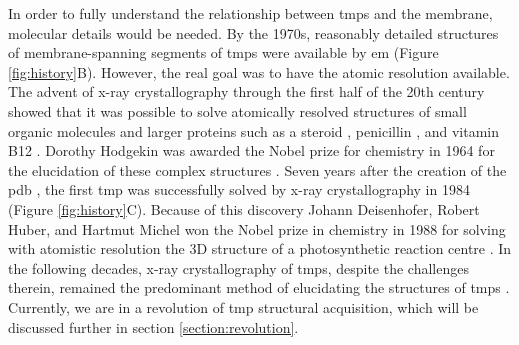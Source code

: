 In order to fully understand the relationship between \gls{tmp}s and the membrane, molecular details would be needed.
By the 1970s, reasonably detailed structures of membrane\--spanning segments of \gls{tmp}s were available by \gls{em} \cite{Henderson1975} (Figure \ref{fig:history}B).
However, the real goal was to have the atomic resolution available.
The advent of x\--ray crystallography through the first half of the 20th century showed that it was possible to solve atomically resolved structures of small organic molecules \cite{Lonsdale1928, Dickinson1923} and larger proteins such as a steroid \cite{Carlisle1945}, penicillin \cite{Hodgekin1949}, and vitamin B12 \cite{HODGKIN1955}.
Dorothy Hodgekin was awarded the Nobel prize for chemistry in 1964 for the elucidation of these complex structures \cite{NobelMedia2018a}.
Seven years after the creation of the \gls{pdb} \cite{Bernstein1978}, the first \gls{tmp} was successfully solved by x\--ray crystallography in 1984 \cite{Deisenhofer1984} (Figure \ref{fig:history}C).
Because of this discovery Johann Deisenhofer, Robert Huber, and Hartmut Michel won the Nobel prize in chemistry in 1988 for solving with atomistic resolution the 3D structure of a photosynthetic reaction centre \cite{NobelMedia2018}.
In the following decades, x\--ray crystallography of \gls{tmp}s, despite the challenges therein, remained the predominant method of elucidating the structures of \gls{tmp}s \cite{Carpenter2008}.
Currently, we are in a revolution of \gls{tmp} structural acquisition, which will be discussed further in section \ref{section:revolution}.

